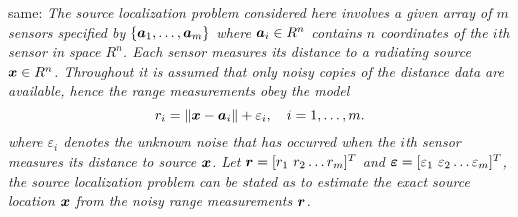





same:
\emph{The source localization problem considered here involves a given array of $m$ sensors specified by $\{\mbox{\boldmath$a$}_1,\ldots, \mbox{\boldmath$a$}_m\}$ where $\mbox{\boldmath$a$}_i\in R^n$  contains  $n$ coordinates of the $i$th sensor in space $R^n$. Each sensor measures its distance to a radiating source $\mbox{\boldmath$x$}\in R^n$. Throughout it is assumed that only noisy copies of the distance data are available, hence the \textit{range measurements} obey the model
\begin{equation} \label{eq:4.1}
\setcounter{equation}{1}
r_i = \|{\Bx} - {\Ba}_i\| + \varepsilon_i, \quad i = 1, \ldots , m.
\end{equation}    
where $\varepsilon_i$ denotes the unknown noise that has occurred when the $i$th sensor measures its distance to source $\mbox{\boldmath$x$}$. Let $\mbox{\boldmath$r$}=[r_1 \ r_2 \ldots r_m]^T$ and $\mbox{\boldmath${\varepsilon}$}=[\varepsilon_1 \ \varepsilon_2 \ldots \varepsilon_m]^T$, the source localization problem can be stated as to estimate the exact source location $\mbox{\boldmath$x$}$ from the noisy range measurements $\mbox{\boldmath$r$}$. }

